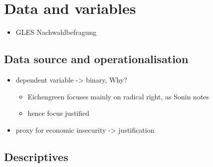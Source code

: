 \documentclass[
]{article}
\providecommand{\tightlist}{%
  \setlength{\itemsep}{0pt}\setlength{\parskip}{0pt}}
\begin{document}
\hypertarget{data-and-variables}{%
\section{Data and variables}\label{data-and-variables}}

\begin{itemize}
\tightlist
\item
  GLES Nachwahlbefragung
\end{itemize}

\hypertarget{data-source-and-operationalisation}{%
\subsection{Data source and
operationalisation}\label{data-source-and-operationalisation}}

\begin{itemize}
\tightlist
\item
  dependent variable -\textgreater{} binary, Why?

  \begin{itemize}
  \tightlist
  \item
    Eichengreen focuses mainly on radical right, as Sonin notes
  \item
    hence focus justified
  \end{itemize}
\item
  proxy for economic insecurity -\textgreater{} justification
\end{itemize}

\hypertarget{descriptives}{%
\subsection{Descriptives}\label{descriptives}}
\end{document}
